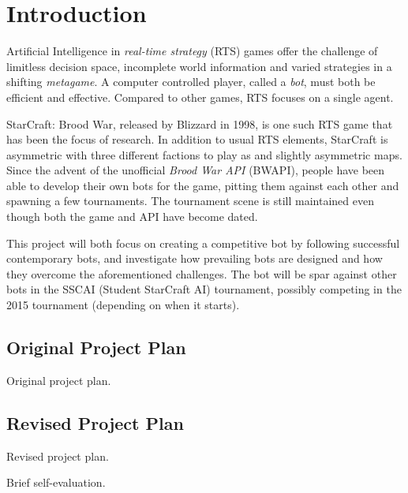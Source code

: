 \chapter{Introduction}
Artificial Intelligence in \emph{real-time strategy} (RTS) games offer the challenge of limitless decision space, incomplete world information and varied strategies in a shifting \emph{metagame}. A computer controlled player, called a \emph{bot}, must both be efficient and effective. Compared to other games, RTS focuses on a single agent.

StarCraft: Brood War, released by Blizzard in 1998, is one such RTS game that has been the focus of research. In addition to usual RTS elements, StarCraft is asymmetric with three different factions to play as and slightly asymmetric maps. Since the advent of the unofficial \emph{Brood War API} (BWAPI), people have been able to develop their own bots for the game, pitting them against each other and spawning a few tournaments. The tournament scene is still maintained even though both the game and API have become dated.

This project will both focus on creating a competitive bot by following successful contemporary bots, and investigate how prevailing bots are designed and how they overcome the aforementioned challenges. The bot will be spar against other bots in the SSCAI (Student StarCraft AI) tournament, possibly competing in the 2015 tournament (depending on when it starts).


\section*{Original Project Plan}
Original project plan.

\section*{Revised Project Plan}
Revised project plan.

Brief self-evaluation.
